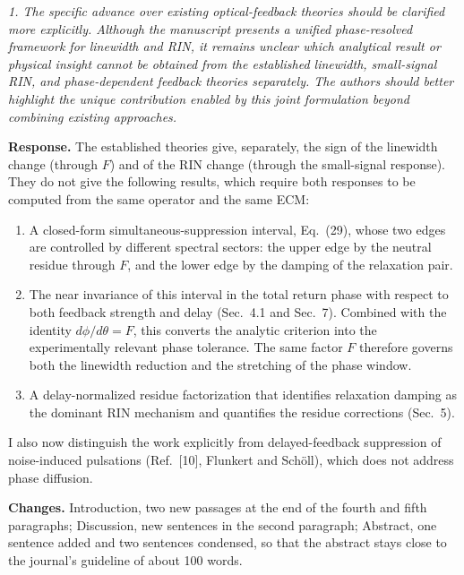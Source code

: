 \documentclass[11pt]{article}
\newenvironment{comment}{\par\medskip\noindent\begin{minipage}{\linewidth}\color{rc}\itshape}{\end{minipage}\par\smallskip}
\newcommand{\resp}{\noindent\textbf{Response.} }
\newcommand{\chg}{\par\noindent\textbf{Changes.} }
\begin{document}
\begin{comment}1. The specific advance over existing optical-feedback theories should be clarified more explicitly. Although the manuscript presents a unified phase-resolved framework for linewidth and RIN, it remains unclear which analytical result or physical insight cannot be obtained from the established linewidth, small-signal RIN, and phase-dependent feedback theories separately. The authors should better highlight the unique contribution enabled by this joint formulation beyond combining existing approaches.\end{comment}
\resp The established theories give, separately, the sign of the linewidth change (through $F$) and of the RIN change (through the small-signal response). They do not give the following results, which require both responses to be computed from the same operator and the same ECM:
\begin{enumerate}
\item A closed-form simultaneous-suppression interval, Eq.~(29), whose two edges are controlled by different spectral sectors: the upper edge by the neutral residue through $F$, and the lower edge by the damping of the relaxation pair.
\item The near invariance of this interval in the total return phase with respect to both feedback strength and delay (Sec.~4.1 and Sec.~7). Combined with the identity $d\phi/d\theta=F$, this converts the analytic criterion into the experimentally relevant phase tolerance. The same factor $F$ therefore governs both the linewidth reduction and the stretching of the phase window.
\item A delay-normalized residue factorization that identifies relaxation damping as the dominant RIN mechanism and quantifies the residue corrections (Sec.~5).
\end{enumerate}
I also now distinguish the work explicitly from delayed-feedback suppression of noise-induced pulsations (Ref.~[10], Flunkert and Sch\"oll), which does not address phase diffusion.
\chg Introduction, two new passages at the end of the fourth and fifth paragraphs; Discussion, new sentences in the second paragraph; Abstract, one sentence added and two sentences condensed, so that the abstract stays close to the journal's guideline of about 100 words.
\end{document}
